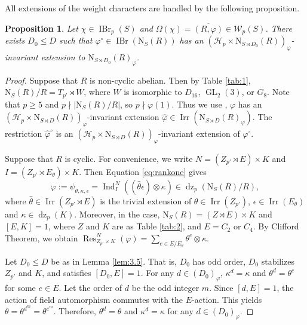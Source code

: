 \documentclass[11pt,a4paper]{article}
\numberwithin{equation}{section}
\newtheorem{proposition}[theorem]{Proposition}
\theoremstyle{definition}
\theoremstyle{remark}
\newcommand{\Irr}{\operatorname{Irr}}
\newcommand{\IBr}{\operatorname{IBr}}
\newcommand{\GL}{\operatorname{GL}}
\newcommand{\dz}{\operatorname{dz}}
\newcommand{\HH}{\mathcal H}
\newcommand{\WW}{\mathcal W}
\newcommand{\NN}{\mathrm N}
\newcommand{\Ind}{\operatorname{Ind}}
\begin{document}
All extensions of the weight characters are handled by the following proposition. 
\begin{proposition}\label{equ:local extention p>=5}
Let $\chi\in\IBr_p(S)$ and  $\Omega(\chi)=\overline{(R,\varphi)}\in\WW_p(S)$.
There exists $D_0\leq D$ such that $\varphi^\circ\in\IBr(\NN_S(R))$  has an $(\HH_p\times \NN_{S\rtimes D_0}(R))_\varphi$-invariant extension to $\NN_{S\rtimes D_0}(R)_{\varphi}$. 
\end{proposition}
\begin{proof}
Suppose that $R$ is non-cyclic abelian. Then by Table \ref{tab:1}, $\NN_S(R)/R=T_{p'}\rtimes W$, where $W$ is isomorphic to  $D_{16}$, $\GL_2(3)$, or $G_8$. Note that $p\geq 5$  and $p\nmid |\NN_S(R)/R|$, so $p\nmid\varphi(1)$. Thus we use \cite[Proposition~4.5]{Johansson},
$\varphi$ has an $(\HH_p\times \NN_{S\rtimes D}(R))_\varphi$-invariant extension $\widehat\varphi\in\Irr(\NN_{S\rtimes D}(R)_\varphi)$. The restriction $\widehat \varphi^\circ$ is
an $(\HH_p\times \NN_{S\rtimes D}(R))_\varphi$-invariant extension of $\varphi^\circ$.

Suppose that $R$ is cyclic. For convenience, we write $N=(Z_{p'}\rtimes E)\times K$ and $I=(Z_{p'}\rtimes E_\theta)\times K$. Then Equation \eqref{eq:rankone} gives 
\[
\varphi:=\psi_{\theta,\kappa,\epsilon}=
 \Ind_{I}^{N}
((\widehat\theta\epsilon)\otimes\kappa)\in\dz_p(\NN_S(R)/R),
\]
where $\widehat \theta\in\Irr(Z_{p'}\rtimes E)$ is
the trivial extension of $\theta\in\Irr(Z_{p'})$, $\epsilon\in\Irr(E_\theta)$ and $\kappa\in\dz_p(K)$.
Moreover, in the case, $\NN_S(R)=(Z\rtimes E)\times K$ and
$[E,K]=1$, where $Z$ and $K$ are as Table \ref{tab:2}, and $E=C_2$ or $C_4$.  By Clifford Theorem, we obtain $\operatorname{Res}_{Z_{p'}\times K}^{N}(\varphi)=\sum_{e\in E/E_\theta}\theta^e\otimes\kappa$.

Let $D_0\leq D$ be as in Lemma \ref{lem:3.5}. That is, $D_0$ has odd order, $D_0$ stabilizes $Z_{p'}$ and $K$, and satisfies $[D_0, E]=1$. For any $d\in (D_0)_\varphi$, $\kappa^d=\kappa$ and $\theta^d=\theta^e$ for some $e\in E$. Let the order of $d$ be the odd integer $m$. Since $[d,E]=1$, the action of field automorphism commutes with the $E$-action. This yields $\theta=\theta^{d^m}=\theta^{e^m}$. Therefore,
$\theta^d=\theta$ and $\kappa^d=\kappa$ for any $d\in (D_0)_\varphi$.


\end{proof}
\end{document}
